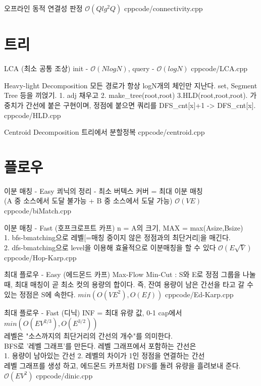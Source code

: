 \documentclass[landscape, 10pt, a4paper, oneside, twocolumn]{extarticle}
\begin{document}
\Algorithm
{오프라인 동적 연결성 판정}
{}
{$\mathcal{O}(Qlg^2Q)$}
{cpp}{code/connectivity.cpp}




\section{트리}

\Algorithm
{LCA (최소 공통 조상)}
{}
{init - $\mathcal{O}(NlogN)$, query - $\mathcal{O}(logN)$}
{cpp}{code/LCA.cpp}

\Algorithm
{Heavy-light Decomposition}
{모든 경로가 항상 logN개의 체인만 지난다. set, Segment Tree 등을 끼얹기. 1. adj 채우고 2. make\_tree(root,root) 3.HLD(root,root,root). 가중치가 간선에 붙은 구현이며, 정점에 붙으면 쿼리를 DFS\_cnt[x]+1 -> DFS\_cnt[x].
}
{}
{cpp}{code/HLD.cpp}

\Algorithm
{Centroid Decomposition}
{트리에서 분할정복
}
{}
{cpp}{code/centroid.cpp}




\section{플로우}

\Algorithm
{이분 매칭 - Easy}
{ 쾨닉의 정리 - 최소 버텍스 커버 = 최대 이분 매칭
\\(A 중 소스에서 도달 불가능 + B 중 소스에서 도달 가능)}
{$\mathcal{O}(VE)$}
{cpp}{code/biMatch.cpp}

\Algorithm
{이분 매칭 - Fast (호프크로프트 카프)}
{n = A의 크기, MAX = max(Asize,Bsize)\\
1. bfs-bmatching으로 레벨[=매칭 중이지 않은 정점과의 최단거리]을 매긴다.\\
2. dfs-bmatching으로 level을 이용해 효율적으로 이분매칭을 할 수 있다
}
{$\mathcal{O}(E \sqrt{V})$}
{cpp}{code/Hop-Karp.cpp}

\Algorithm
{최대 플로우 - Easy (에드몬드 카프)}
{Max-Flow Min-Cut : S와 E로 정점 그룹을 나눌 때, 최대 매칭이 곧 최소 컷의 용량의 합이다. 즉, 잔여 용량이 남은 간선을 타고 갈 수 있는 정점은 S에 속한다.}
{$\mathcal {}min({O}(VE^2), {O}(Ef))$}
{cpp}{code/Ed-Karp.cpp}

\Algorithm
{최대 플로우 - Fast (디닉)}
{INF = 최대 유량 값, 0-1 cap에서 $\mathcal {}min({O}(EV^{2/3}), {O}(E^{3/2}))$\\
레벨은 "소스까지의 최단거리의 간선의 개수"를 의미한다.\\
BFS로 '레벨 그래프'를 만든다. 레벨 그래프에서 포함하는 간선은\\
1. 용량이 남아있는 간선 2. 레벨의 차이가 1인 정점을 연결하는 간선\\
레벨 그래프를 생성 하고, 에드몬드 카프처럼 DFS를 돌려 유량을 흘려보내 준다.
}
{$\mathcal{O}(EV^2)$}
{cpp}{code/dinic.cpp}
\end{document}
